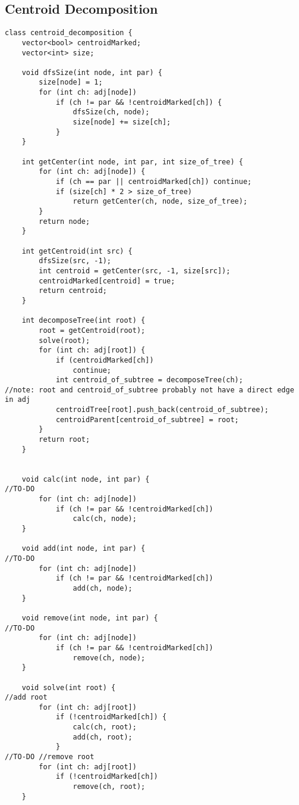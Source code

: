 \documentclass{article}
\begin{document}
\subsection{Centroid Decomposition}
\begin{verbatim}
class centroid_decomposition {  
    vector<bool> centroidMarked;  
    vector<int> size;  
  
    void dfsSize(int node, int par) {  
        size[node] = 1;  
        for (int ch: adj[node])  
            if (ch != par && !centroidMarked[ch]) {  
                dfsSize(ch, node);  
                size[node] += size[ch];  
            }  
    }  
  
    int getCenter(int node, int par, int size_of_tree) {  
        for (int ch: adj[node]) {  
            if (ch == par || centroidMarked[ch]) continue;  
            if (size[ch] * 2 > size_of_tree)  
                return getCenter(ch, node, size_of_tree);  
        }  
        return node;  
    }  
  
    int getCentroid(int src) {  
        dfsSize(src, -1);  
        int centroid = getCenter(src, -1, size[src]);  
        centroidMarked[centroid] = true;  
        return centroid;  
    }  
  
    int decomposeTree(int root) {  
        root = getCentroid(root);  
        solve(root);  
        for (int ch: adj[root]) {  
            if (centroidMarked[ch])  
                continue;  
            int centroid_of_subtree = decomposeTree(ch);  
//note: root and centroid_of_subtree probably not have a direct edge in adj  
            centroidTree[root].push_back(centroid_of_subtree);  
            centroidParent[centroid_of_subtree] = root;  
        }  
        return root;  
    }  
  
      
    void calc(int node, int par) {  
//TO-DO  
        for (int ch: adj[node])  
            if (ch != par && !centroidMarked[ch])  
                calc(ch, node);  
    }  
  
    void add(int node, int par) {  
//TO-DO  
        for (int ch: adj[node])  
            if (ch != par && !centroidMarked[ch])  
                add(ch, node);  
    }  
  
    void remove(int node, int par) {  
//TO-DO  
        for (int ch: adj[node])  
            if (ch != par && !centroidMarked[ch])  
                remove(ch, node);  
    }  
  
    void solve(int root) {  
//add root  
        for (int ch: adj[root])  
            if (!centroidMarked[ch]) {  
                calc(ch, root);  
                add(ch, root);  
            }  
//TO-DO //remove root  
        for (int ch: adj[root])  
            if (!centroidMarked[ch])  
                remove(ch, root);  
    }  
  

\end{verbatim}
\end{document}
